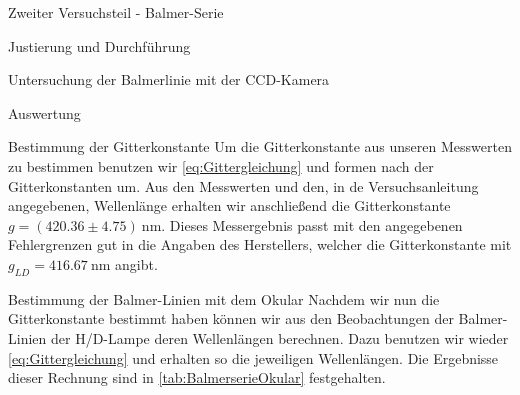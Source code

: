 \documentclass[pdftex, a4paper,11pt, twoside, ngerman]{report}
\begin{document}
\begin{chapter}{Zweiter Versuchsteil - Balmer-Serie}
\begin{section}{Justierung und Durchführung}
\begin{subsection}{Untersuchung der Balmerlinie mit der CCD-Kamera}
      \end{subsection}

    \end{section}


    

    \begin{section}{Auswertung}
      \label{chp:Balmer:sec:Auswertung}
      
      
      
      \begin{subsection}{Bestimmung der Gitterkonstante}
        \label{chp:Balmer:sec:Auswertung:subsec:Gitterkonstante}
        Um die Gitterkonstante aus unseren Messwerten zu bestimmen benutzen 
        wir \cref{eq:Gittergleichung} und formen nach der Gitterkonstanten um.
        Aus den Messwerten und den, in de Versuchsanleitung angegebenen,
        Wellenlänge erhalten wir anschließend die Gitterkonstante
        $g=(420.36 \pm 4.75) \SI{}{\nano\meter}$. Dieses Messergebnis passt 
        mit den angegebenen Fehlergrenzen gut in die Angaben des Herstellers, 
        welcher die Gitterkonstante mit $g_{LD}=\SI{416.67}{\nano\meter}$ 
        angibt.\cite{bib:LDDidactic}
        
      \end{subsection}
      
      
      
      \begin{subsection}{Bestimmung der Balmer-Linien mit dem Okular}
        \label{chp:Balmer:sec:Auswertung:subsec:Okular}
        Nachdem wir nun die Gitterkonstante bestimmt 
        haben können wir aus den Beobachtungen der Balmer-Linien der 
        H/D-Lampe deren Wellenlängen berechnen. Dazu benutzen wir wieder 
        \cref{eq:Gittergleichung} und erhalten so die jeweiligen Wellenlängen. 
        Die Ergebnisse dieser Rechnung sind in \cref{tab:BalmerserieOkular} 
        festgehalten.
        
        

\end{subsection}
\end{section}
\end{chapter}
\end{document}
